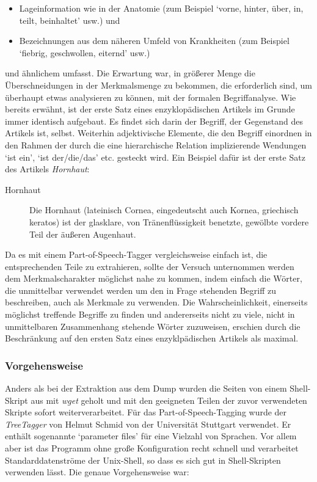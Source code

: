 \documentclass[pagesize,DIV=calc,12pt,draft]{scrreprt}
\begin{document}
\begin{itemize}
\item Lageinformation wie in der Anatomie (zum Beispiel `vorne, hinter, über, in, teilt, beinhaltet' usw.) und
\item Bezeichnungen aus dem näheren Umfeld von Krankheiten (zum Beispiel  `fiebrig, geschwollen, eiternd' usw.)
\end{itemize}

und ähnlichem umfasst. 
Die Erwartung war, in größerer Menge die Überschneidungen in der Merkmalsmenge zu bekommen, die erforderlich sind, um überhaupt etwas analysieren zu können, mit der formalen Begriffanalyse. 
Wie bereits erwähnt, ist der erste Satz eines enzyklopädischen Artikels im Grunde immer identisch aufgebaut. 
Es findet sich darin der Begriff, der Gegenstand des Artikels ist, selbst. 
Weiterhin adjektivische Elemente, die den Begriff einordnen in den Rahmen der durch die eine hierarchische Relation implizierende Wendungen `ist ein', `ist der/die/das' etc. 
gesteckt wird. 
Ein Beispiel dafür ist der erste Satz des Artikels \emph{Hornhaut}: 

\begin{description}
\item[Hornhaut]
Die Hornhaut (lateinisch Cornea, eingedeutscht auch Kornea, griechisch keratos) ist der glasklare, von Tränenflüssigkeit benetzte, gewölbte vordere Teil der äußeren Augenhaut. 
\end{description}

Da es mit einem Part-of-Speech-Tagger vergleichsweise einfach ist, die entsprechenden Teile zu extrahieren, sollte der Versuch unternommen werden dem Merkmalscharakter möglichst nahe zu kommen, indem einfach die Wörter, die unmittelbar verwendet werden um den in Frage stehenden Begriff zu beschreiben, auch als Merkmale zu verwenden. 
Die Wahrscheinlichkeit, einerseits möglichst treffende Begriffe zu finden und andererseits nicht zu viele, nicht in unmittelbaren Zusammenhang stehende Wörter zuzuweisen, erschien durch die Beschränkung auf den ersten Satz eines enzyklpädischen Artikels als maximal. 

\subsubsection{Vorgehensweise}

Anders als bei der Extraktion aus dem Dump wurden die Seiten von einem Shell-Skript aus mit \emph{wget} geholt und mit den geeigneten Teilen der zuvor verwendeten Skripte sofort weiterverarbeitet. 
Für das Part-of-Speech-Tagging wurde der \emph{TreeTagger} von Helmut Schmid von der Universität Stuttgart verwendet. 
Er enthält sogenannte `parameter files' für eine Vielzahl von Sprachen. 
Vor allem aber ist das Programm ohne große Konfiguration recht schnell und verarbeitet Standarddatenströme der Unix-Shell, so dass es sich gut in Shell-Skripten verwenden lässt. 
Die genaue Vorgehensweise war: 
\end{document}
